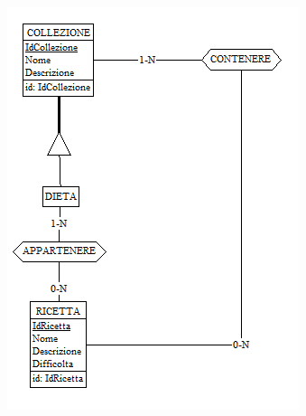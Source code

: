 ﻿\documentclass[a4paper,12pt]{report}
\begin{document}
\begin{figure}[h!]
    \centering
    \includegraphics[width=0.5\linewidth]{app_images/gerarchia_collezione.png}
\end{figure}
\end{document}
